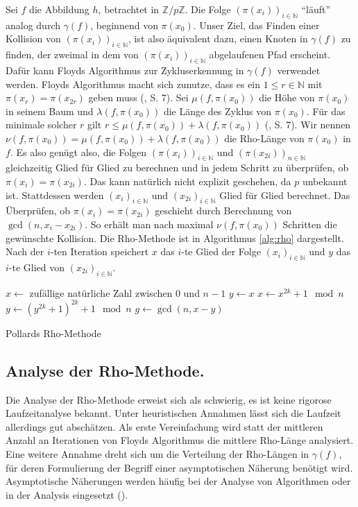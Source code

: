 \documentclass[a4paper, 11pt, ngerman]{article}
\newcommand{\N}{\mathbb{N}}
\newcommand{\Z}{\mathbb{Z}}
\theoremstyle{definition}
\theoremstyle{plain}
\theoremstyle{remark}
\begin{document}
Sei $f$ die Abbildung $h$, betrachtet in $\Z/p\Z$. Die Folge $(\pi(x_{i}))_{i \in \N}$ "`läuft"' analog durch $\gamma(f)$, beginnend von $\pi(x_0)$. Unser Ziel, das Finden einer Kollision von $(\pi(x_i))_{i \in \N}$, ist also äquivalent dazu, einen Knoten in $\gamma(f)$ zu finden, der zweimal in dem von $(\pi(x_i))_{i \in \N}$ abgelaufenen Pfad erscheint. Dafür kann Floyds Algorithmus zur Zykluserkennung in $\gamma(f)$ verwendet werden. Floyds Algorithmus macht sich zunutze, dass es ein $1 \le r \in \N$ mit $\pi(x_r) = \pi(x_{2r})$ geben muss (\cite{knu98}, S. 7). Sei $\mu(f, \pi(x_0))$ die Höhe von $\pi(x_0)$ in seinem Baum und $\lambda(f, \pi(x_0))$ die Länge des Zyklus von $\pi(x_0)$. Für das minimale solcher $r$ gilt $r \le \mu(f, \pi(x_0)) + \lambda(f, \pi(x_0))$ (\cite{knu98}, S. 7). Wir nennen $\nu(f, \pi(x_0)) = \mu(f, \pi(x_0)) + \lambda(f, \pi(x_0))$ die Rho-Länge von $\pi(x_0)$ in $f$. Es also genügt also, die Folgen $(\pi(x_i))_{i \in \N}$ und $(\pi(x_{2i}))_{n \in \N}$ gleichzeitig Glied für Glied zu berechnen und in jedem Schritt zu überprüfen, ob $\pi(x_i) = \pi(x_{2i})$. Das kann natürlich nicht explizit geschehen, da $p$ unbekannt ist. Stattdessen werden $(x_i)_{i \in \N}$ und $(x_{2i})_{i \in \N}$ Glied für Glied berechnet. Das Überprüfen, ob $\pi(x_i) = \pi(x_{2i})$ geschieht durch Berechnung von $\gcd(n, x_i - x_{2i})$. So erhält man nach maximal $\nu(f, \pi(x_0))$ Schritten die gewünschte Kollision. Die Rho-Methode ist in Algorithmus \ref{alg:rho} dargestellt. Nach der $i$-ten Iteration speichert $x$ das $i$-te Glied der Folge $(x_i)_{i \in \N}$ und $y$ das $i$-te Glied von $(x_{2i})_{i \in \N}$.
\begin{algorithm}
    $x \gets $ zufällige natürliche Zahl zwischen $0$ und $n - 1$ \;
    $y \gets x$ \;
    {
        $x \gets x^{2k} + 1 \mod n$ \;
        $y \gets (y^{2k} + 1)^{2k} + 1 \mod n$ \;
        $g \gets \gcd(n, x - y)$ \;
        {
             \;
        }
    }

    \caption{Pollards Rho-Methode}
    \label{alg:rho}
\end{algorithm}
\subsection{Analyse der Rho-Methode.}

Die Analyse der Rho-Methode erweist sich als schwierig, es ist keine rigorose Laufzeitanalyse bekannt. Unter heuristischen Annahmen lässt sich die Laufzeit allerdings gut abschätzen. Als erste Vereinfachung wird statt der mittleren Anzahl an Iterationen von Floyds Algorithmus die mittlere Rho-Länge analysiert. Eine weitere Annahme dreht sich um die Verteilung der Rho-Längen in $\gamma(f)$, für deren Formulierung der Begriff einer asymptotischen Näherung benötigt wird. Asymptotische Näherungen werden häufig bei der Analyse von Algorithmen oder in der Analysis eingesetzt (\cite{asym}).
\end{document}
